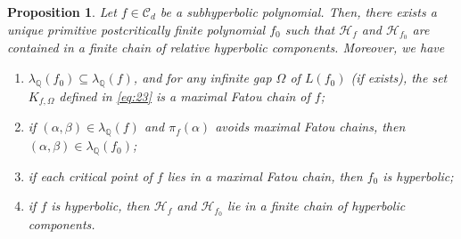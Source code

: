 \documentclass[a4paper,reqno,times, 11pt]{amsart}
\newtheorem{proposition}[theorem]{Proposition}
\theoremstyle{remark}
\theoremstyle{plain}
\numberwithin{equation}{section}
\def\HHHH{\mathscr H}
\def\CCCC{\mathscr C}
\def\Q{\mathbb Q}
\begin{document}
\begin{proposition}\label{pro:reduction}
	Let $f\in\CCCC_d$ be a subhyperbolic polynomial. Then, there exists a unique primitive postcritically finite polynomial $f_0$ such that $\HHHH_f$ and $\HHHH_{f_0}$ are contained in a finite chain of relative hyperbolic components. Moreover, we have
	\begin{enumerate}
		\item $\lambda_\Q(f_0)\subseteq \lambda_\Q(f)$, and for any infinite gap $\Omega$ of $L(f_0)$ (if exists), the set $K_{f,\Omega}$ defined in \eqref{eq:23}  is a maximal Fatou chain of $f$;
		\item if $(\alpha,\beta)\in\lambda_\Q(f)$ and $\pi_f(\alpha)$ avoids  maximal Fatou chains, then  $(\alpha,\beta)\in\lambda_\Q(f_0)$;
		\item if each critical point of $f$ lies in a maximal Fatou chain, then $f_0$ is hyperbolic;
		\item if $f$ is hyperbolic, then $\HHHH_f$ and $\HHHH_{f_0}$ lie in a finite chain of hyperbolic components.
	\end{enumerate}
\end{proposition}
\end{document}
